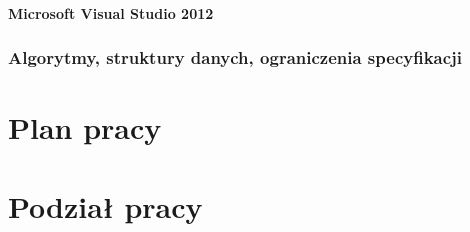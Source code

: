\documentclass[a4paper,twoside]{article}
\begin{document}
		\subsection{Microsoft Visual Studio 2012}
	
	
	\section{Algorytmy, struktury danych, ograniczenia specyfikacji}
	
	\newpage
	
	\part{Plan pracy}
	
	\newpage
	
	\part{Podział pracy}
	
	
\end{document}
